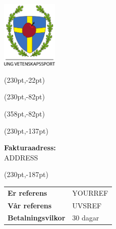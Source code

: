 \documentclass[a4paper,11pt]{article}
\begin{document}
\pagestyle{fancy}
\fancyhf{}
\renewcommand{\headrulewidth}{0pt}
\renewcommand{\footrulewidth}{0pt}

\setlength{\fboxsep}{1.5em}
\setlength{\parindent}{0pt}

\includegraphics[width=0.2\textwidth]{logo.png}



\fancyput*(230pt,-22pt){}

\fancyput*(230pt,-82pt){}

\fancyput*(358pt,-82pt){}

\fancyput*(230pt,-137pt){}

\vspace{3em}
\textbf{Fakturaadress:}\\[1em]
ADDRESS

\fancyput*(230pt,-187pt){
    \begin{minipage}{85pt}
      \begin{tabular}{ll}
        \textbf{Er referens} & YOURREF \\
        \textbf{Vår referens} & UVSREF \\
        \textbf{Betalningsvilkor} & 30 dagar
      \end{tabular}
    \end{minipage}}

\vspace{10em}
\end{document}
